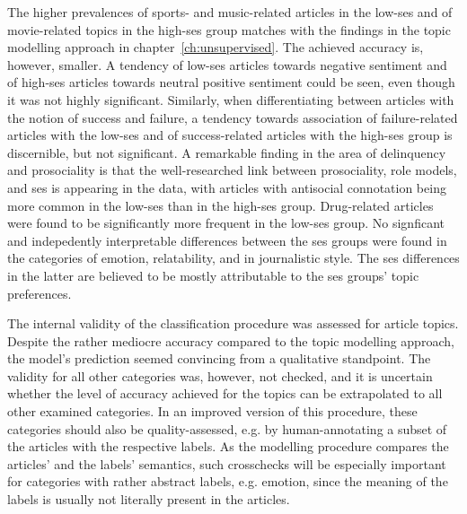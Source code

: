 The higher prevalences of sports- and music-related articles in the low-\gls{ses} and of movie-related topics in the high-\gls{ses} group matches with the findings in the topic modelling approach in chapter~\ref{ch:unsupervised}. The achieved accuracy is, however, smaller. A tendency of low-\gls{ses} articles towards negative sentiment and of high-\gls{ses} articles towards neutral positive sentiment could be seen, even though it was not highly significant. Similarly, when differentiating between articles with the notion of success and failure, a tendency towards association of failure-related articles with the low-\gls{ses} and of success-related articles with the high-\gls{ses} group is discernible, but not significant. A remarkable finding in the area of delinquency and prosociality is that the well-researched link between prosociality, role models, and \gls{ses} is appearing in the data, with articles with antisocial connotation being more common in the low-\gls{ses}  than in the high-\gls{ses} group. Drug-related articles were found to be significantly more frequent in the low-\gls{ses} group. No signficant and indepedently interpretable differences between the \gls{ses} groups were found in the categories of emotion, relatability, and in journalistic style. The \gls{ses} differences in the latter are believed to be mostly attributable to the \gls{ses} groups' topic preferences.

The internal validity of the classification procedure was assessed for article topics. Despite the rather mediocre accuracy compared to the topic modelling approach, the model's prediction seemed convincing from a qualitative standpoint. The validity for all other categories was, however, not checked, and it is uncertain whether the level of accuracy achieved for the topics can be extrapolated to all other examined categories. In an improved version of this procedure, these categories should also be quality-assessed, e.g. by human-annotating a subset of the articles with the respective labels. As the modelling procedure compares the articles' and the labels' semantics, such crosschecks will be especially important for categories with rather abstract labels, e.g. emotion, since the meaning of the labels is usually not literally present in the articles.


